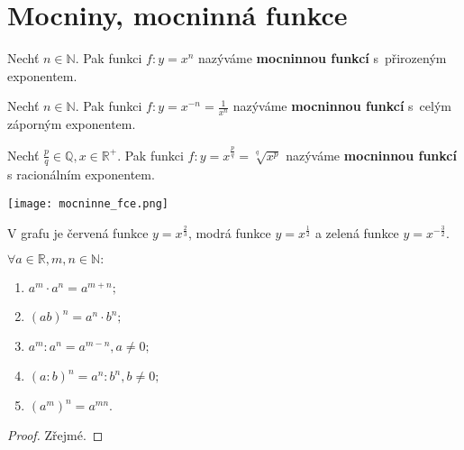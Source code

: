 \section{Mocniny, mocninná funkce}
\begin{minipage}{0.65\textwidth}
\begin{definition}
    Nechť $n\in \mathbb N.$ Pak funkci $f: y=x^n$ nazýváme \textbf{mocninnou funkcí}
    s~přirozeným exponentem.
\end{definition}

\begin{definition}
    Nechť $n\in \mathbb N.$ Pak funkci $f: y=x^{-n}=\frac{1}{x^n}$ nazýváme
    \textbf{mocninnou funkcí} s~celým záporným exponentem.
\end{definition}

\begin{definition}
    Nechť $\frac{p}{q}\in \mathbb Q, x \in \mathbb R^+.$ Pak funkci $f: y=
    x^{\frac{p}{q}}=\sqrt[q]{x^p}$ nazýváme \textbf{mocninnou funkcí}
    s racionálním exponentem.
\end{definition}
\end{minipage}
\hfill
\begin{minipage}{0.35\textwidth}
\vspace{-1em}\noindent\hfill\texttt{[image: mocninne\_fce.png]}
\end{minipage}

\begin{pozn}
    V grafu je červená funkce $y=x^\frac{2}{3}$, modrá funkce $y=x^\frac{1}{2}$ a
    zelená funkce $y=x^{-\frac{3}{2}}$.
\end{pozn}


\begin{veta}
    $\forall a \in \mathbb R, m,n \in \mathbb N:$
    \begin{enumerate}[$i.$]
        \item $a^m\cdot a^n=a^{m+n};$
       	\item $(ab)^n = a^n\cdot b^n;$
       	\item $a^m : a^n = a^{m-n}, a \ne 0;$
       	\item $(a : b)^n = a^n : b^n, b \ne 0;$
       	\item $\left ( a^m \right )^n = a^{mn}.$
    \end{enumerate}
\end{veta}

\begin{proof}
    Zřejmé.
\end{proof}

